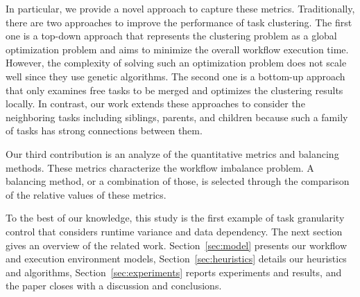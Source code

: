 \documentclass[final]{IEEEtran}
\begin{document}
In particular, we provide a novel approach to capture these metrics. Traditionally, there are two approaches to improve the performance of task clustering. The first one is a top-down approach \cite{6217508} that represents the clustering problem as a global optimization problem and aims to minimize the overall workflow execution time. However, the complexity of solving such an optimization problem does not scale well since they use genetic algorithms. The second one is a bottom-up approach~\cite{Muthuvelu:2005:DJG:1082290.1082297,4958835} that only examines free tasks to be merged and optimizes the clustering results locally. In contrast, our work extends these approaches to consider the neighboring tasks including siblings, parents, and children because such a family of tasks has strong connections between them. 

Our third contribution is an analyze of the quantitative metrics and balancing methods. These metrics characterize the workflow imbalance problem. A balancing method, or a combination of those, is selected through the comparison of the relative values of these metrics.


%

To the best of our knowledge, this study is the first example of task granularity control that considers runtime variance and data dependency. The next section gives an overview of the related work. Section~\ref{sec:model} presents our workflow and execution environment models, Section~\ref{sec:heuristics} details our heuristics and algorithms, Section~\ref{sec:experiments} reports experiments and results, and the paper closes with a discussion and conclusions.
\end{document}
